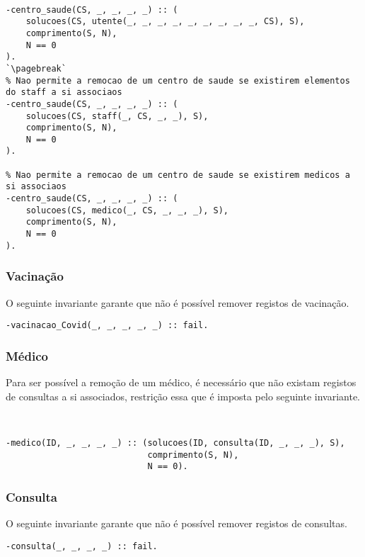\

\begin{lstlisting}[caption={Invariantes de remoção relativos ao predicado \texttt{centro\_saude}}]
% Nao permite a remocao de um centro de saude se existirem utentes a si associaos
-centro_saude(CS, _, _, _, _) :: (
    solucoes(CS, utente(_, _, _, _, _, _, _, _, _, CS), S),
    comprimento(S, N),
    N == 0
).
`\pagebreak`
% Nao permite a remocao de um centro de saude se existirem elementos do staff a si associaos
-centro_saude(CS, _, _, _, _) :: (
    solucoes(CS, staff(_, CS, _, _), S),
    comprimento(S, N),
    N == 0
).

% Nao permite a remocao de um centro de saude se existirem medicos a si associaos
-centro_saude(CS, _, _, _, _) :: (
    solucoes(CS, medico(_, CS, _, _, _), S),
    comprimento(S, N),
    N == 0
).
\end{lstlisting}

\subsubsection*{Vacinação}
O seguinte invariante garante que não é possível remover registos de vacinação.

\begin{lstlisting}[caption={Invariante de remoção relativos ao predicado \texttt{vacinacao\_covid}}]
% Nao permite a remocao de registos de atos de vacinacao
-vacinacao_Covid(_, _, _, _, _) :: fail.
\end{lstlisting}

\subsubsection*{Médico}
Para ser possível a remoção de um médico, é necessário que não existam registos de consultas a si associados, restrição
essa que é imposta pelo seguinte invariante.

\

\begin{lstlisting}[caption={Invariante de remoção relativo ao predicado \texttt{medico}}]
% Nao permite a remocao de um medico se existirem consultas a si associadas
-medico(ID, _, _, _, _) :: (solucoes(ID, consulta(ID, _, _, _), S),
                            comprimento(S, N),
                            N == 0).
\end{lstlisting}

\subsubsection*{Consulta}
O seguinte invariante garante que não é possível remover registos de consultas.
\
\begin{lstlisting}[caption={Invariante de remoção relativo ao predicado \texttt{consulta}}]
% Nao permite a remocao de registos de consultas
-consulta(_, _, _, _) :: fail.
\end{lstlisting}
